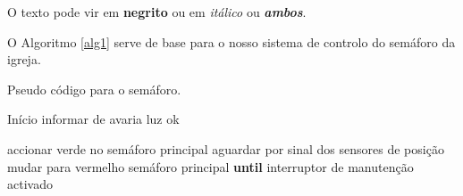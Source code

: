 O texto pode vir em \textbf{negrito} ou em \textit{itálico} ou \textbf{\textit{ambos}}.

O Algoritmo \ref{alg1} serve de base para o nosso sistema de controlo do semáforo da igreja.
\begin{algorithm}
	\caption{Pseudo código para o semáforo.}
	\label{alg1}
	\begin{algorithmic}
		\STATE Início
				\STATE informar de avaria
			\ELSE
				\STATE luz ok
			\ENDIF 
		\ENDFOR
		
		\LOOP
			\STATE accionar verde no semáforo principal
			\STATE aguardar por sinal dos sensores de posição
				\STATE mudar para vermelho semáforo principal
			\ENDIF
		\ENDLOOP
		\STATE \textbf{until} interruptor de manutenção activado
	\end{algorithmic}
\end{algorithm}

